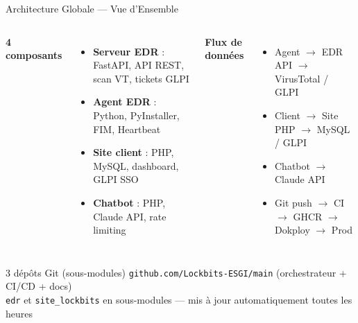 \documentclass[xcolor=dvipsnames, aspectratio=169, 10pt]{beamer}
\newcommand{\bitem}{\item[$\bullet$]}
\begin{document}
\begin{frame}{Architecture Globale — Vue d'Ensemble}
  \begin{columns}[t]
    \textbf{4 composants}
    \begin{itemize}
      \bitem \textbf{Serveur EDR} : FastAPI, API REST, scan VT, tickets GLPI
      \bitem \textbf{Agent EDR} : Python, PyInstaller, FIM, Heartbeat
      \bitem \textbf{Site client} : PHP, MySQL, dashboard, GLPI SSO
      \bitem \textbf{Chatbot} : PHP, Claude API, rate limiting
    \end{itemize}
    \textbf{Flux de données}
    \begin{itemize}
      \bitem Agent $\rightarrow$ EDR API $\rightarrow$ VirusTotal / GLPI
      \bitem Client $\rightarrow$ Site PHP $\rightarrow$ MySQL / GLPI
      \bitem Chatbot $\rightarrow$ Claude API
      \bitem Git push $\rightarrow$ CI $\rightarrow$ GHCR $\rightarrow$ Dokploy $\rightarrow$ Prod
    \end{itemize}
  \end{columns}
  \vspace{0.3cm}
  \begin{alertblock}{3 dépôts Git (sous-modules)}
    \texttt{github.com/Lockbits-ESGI/main} (orchestrateur + CI/CD + docs) \\
    \texttt{edr} et \texttt{site\_lockbits} en sous-modules — mis à jour automatiquement toutes les heures
  \end{alertblock}
\end{frame}
\end{document}
